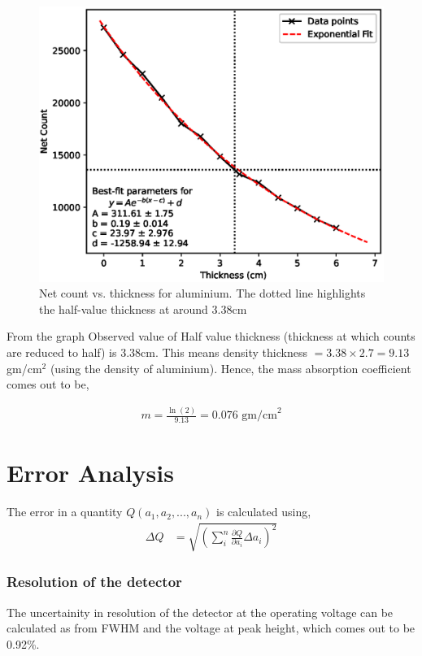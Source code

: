 \begin{figure}[H]
    \centering
    \includegraphics[width=1\columnwidth]{images/al.eps}
    \caption{Net count vs. thickness for aluminium. The dotted line highlights the half-value thickness at around 3.38cm}
    \label{al}
\end{figure}

From the graph Observed value of Half value thickness (thickness at which counts are reduced to half) is 3.38cm. This means density thickness $= 3.38\times 2.7 =9.13$ gm/cm$^2$ (using the density of aluminium). Hence, the mass absorption coefficient comes out to be,

\begin{align*}
    m=\frac{\ln(2)}{9.13} =0.076 \text{ gm/cm}^2
\end{align*}

\section{Error Analysis}

The error in a quantity $Q(a_1, a_2, ..., a_n)$ is calculated using,
\begin{align} \Delta Q &= \sqrt{\left( \sum_i^n \frac{\partial Q}{\partial a_i} \Delta a_i \right)^2} \end{align}

\subsubsection*{Resolution of the detector}
The uncertainity in resolution of the detector at the operating voltage can be calculated as from FWHM and the voltage at peak height, which comes out to be 0.92\%.

